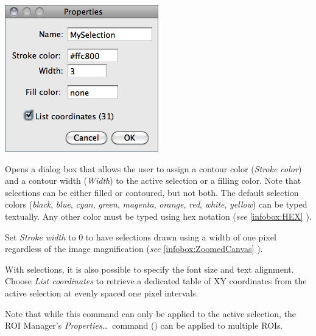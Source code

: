 \begin{minipage}[c][1\totalheight][t]{0.365\columnwidth}%
\includegraphics[scale=0.55]{images/Properties}%
\end{minipage}%
\begin{minipage}[c][1\totalheight][t]{0.635\columnwidth}%
Opens a dialog box that allows the user to assign a contour color
(\emph{Stroke color}) and a contour width (\emph{Width}) to the active
selection or a filling color. Note that selections can be either filled
or contoured, but not both. The default selection colors (\emph{black},
\emph{blue}, \emph{cyan}, \emph{green}, \emph{magenta}, \emph{orange},
\emph{red}, \emph{white}, \emph{yellow}) can be typed textually. Any
other color must be typed using hex notation (\emph{see} \ref{infobox:HEX}
).\medskip{}


Set \emph{Stroke width} to 0 to have selections drawn using a width
of one pixel regardless of the image magnification (\emph{see} \ref{infobox:ZoomedCanvas}
). %
\end{minipage}

With  selections, it is also possible to specify
the font size and text alignment. Choose \emph{List coordinates} to
retrieve a dedicated table of XY coordinates from the active selection
at evenly spaced one pixel intervals.

Note that while this command can only be applied to the active selection,
the ROI Manager's \emph{Properties\ldots{}}\ command ()
can be applied to multiple ROIs. 




